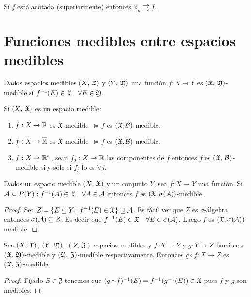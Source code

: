 \begin{note}
    Si $f$ está acotada (superiormente) entonces $\phi_n \rightrightarrows f$.
\end{note}

\clearpage

\section{Funciones medibles entre espacios medibles}

\begin{definition}
    Dados espacios medibles $(X\text{, } \mathfrak{X})$ y $(Y\text{, } \mathfrak{Y})$ una función $f : X \to Y$ es $(\mathfrak{X}\text{, } \mathfrak{Y})$-medible si $f^{-1}(E) \in \mathfrak{X} \quad \forall E \in \mathfrak{Y}$.
\end{definition}

\begin{eg}
    Si $(X\text{, } \mathfrak{X})$ es un espacio medible:
    \begin{enumerate}
        \item $f: X \to \mathbb{R}$ es $\mathfrak{X}$-medible $\iff f$ es $(\mathfrak{X}, \mathcal{B})$-medible.
        \item $f: X \to \overline{\mathbb{R}}$ es $\mathfrak{X}$-medible $\iff f$ es $(\mathfrak{X}, \overline{\mathcal{B}})$-medible.
        \item $f: X \to \mathbb{R}^n$, sean $f_j : X \to \mathbb{R}$ las componentes de $f$ entonces $f$ es $(\mathfrak{X}\text{, } \mathcal{B})$-medible si y sólo si $f_j$ lo es $\forall j$.
    \end{enumerate}
\end{eg}

\begin{prop}
    Dados un espacio medible $(X\text{, } \mathfrak{X})$ y un conjunto $Y$, sea $f: X \to Y$ una función.
    Si $\mathcal{A} \subseteq P(Y) : f^{-1}(A) \in \mathfrak{X} \quad \forall A \in \mathcal{A}$ entonces $f$ es $(\mathfrak{X}, \sigma(\mathcal{A}))$-medible.

    \begin{proof}
        Sea $Z = \{ E \subseteq Y : f^{-1}(E) \in \mathfrak{X} \} \supseteq \mathcal{A}$. Es fácil ver que $Z$ es $\sigma$-álgebra entonces $\sigma(\mathcal{A}) \subseteq Z$.
        Es decir que $f^{-1}(E) \in \mathfrak{X} \quad \forall E \in \sigma(\mathcal{A})$. Luego $f$ es $(\mathfrak{X}, \sigma(\mathcal{A}))$-medible.
    \end{proof}
\end{prop}

\begin{prop}
    Sea $(X\text{, } \mathfrak{X})$, $(Y\text{, } \mathfrak{Y})$, $(Z\text{, } \mathfrak{Z})$ espacios medibles y $f: X \to Y$ y $g: Y \to Z$ funciones $(\mathfrak{X} \text{, } \mathfrak{Y})$-medible y $(\mathfrak{Y} \text{, } \mathfrak{Z})$-medible respectivamente.
    Entonces $g \circ f : X \to Z$ es $(\mathfrak{X}\text{, } \mathfrak{Z})$-medible.
    \begin{proof}
        Fijado $E \in \mathfrak{Z}$ tenemos que $(g \circ f)^{-1}(E) = f^{-1}(g^{-1}(E)) \in \mathfrak{X}$ pues $f$ y $g$ son medibles.
    \end{proof}
\end{prop}